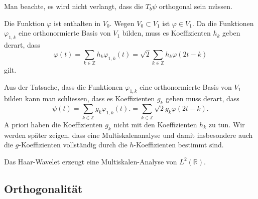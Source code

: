 Man beachte, es wird nicht verlangt, dass die $T_b\psi$ orthogonal
sein müssen.

Die Funktion $\varphi$ ist enthalten in $V_0$.
Wegen $V_0\subset V_1$ ist $\varphi\in V_1$.
Da die Funktionen $\varphi_{1,k}$ eine orthonormierte Basis von $V_1$
bilden, muss es Koeffizienten $h_k$ geben derart, dass
\begin{equation}
\varphi(t) = \sum_{k\in\mathbb Z} h_k\varphi_{1,k}(t)
=
\sqrt{2}\sum_{k\in\mathbb Z}h_k\varphi(2t-k)
\label{msa:skalrel-h}
\end{equation}
gilt.

Aus der Tatsache, dass die Funktionen $\varphi_{1,k}$ eine orthonormierte
Basis von $V_1$ bilden kann man schliessen, dass es Koeffizienten $g_k$
geben muss derart, dass
\begin{equation}
\psi(t)
=
\sum_{k\in\mathbb Z} g_k\varphi_{1,k}(t).
=
\sum_{k\in\mathbb Z}\sqrt{2}g_k \varphi(2t-k).
\label{msa:skalrel-g}
\end{equation}
A priori haben die Koeffizienten $g_k$ nicht mit den Koeffizienten $h_k$
zu tun.
Wir werden später zeigen, dass eine Multiskalenanalyse und damit
insbesondere auch die $g$-Koeffizienten vollständig durch
die $h$-Koeffizienten bestimmt sind.

\begin{beispiel}
Das Haar-Wavelet erzeugt eine Multiskalen-Analyse von $L^2(\mathbb R)$.
\end{beispiel}

\begin{beispiel}
\end{beispiel}

\subsection{Orthogonalität}

